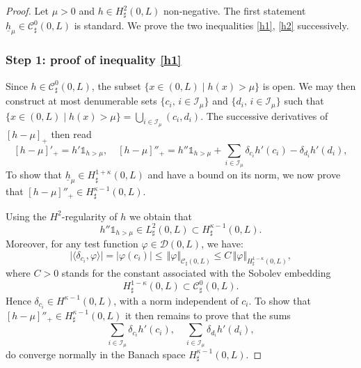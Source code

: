 \documentclass[10pt]{amsart}
\let\mathcal\mathscr
\theoremstyle{remark}
\theoremstyle{definition}
\newcommand{\norme}[1]{\,\Vert #1\Vert}
\newcommand{\hb}{{\underline{h}}}
\begin{document}
\begin{proof}Let $\mu>0$ and $h \in H^{2}_{\sharp}(0,L)$ non-negative. The first statement $\hb_{\mu}\in \mathcal{C}_\sharp^{0}(0,L)$ is standard. We prove the two inequalities \eqref{h1}, \eqref{h2} successively.

\subsubsection*{Step 1: proof of inequality \eqref{h1}}
Since $h \!\in\!{\mathcal C}^0_{\sharp}(0,L)$, the subset \hbox{$\{x\!\in\!(0, L)\mid h(x)\!>\!\mu\}$} is open.
We may then construct at most denumerable sets $\{c_i, \, i\!\in\!\mathcal I_{\mu}\}$ and \hbox{$\{ d_i, \, i\!\in\!\mathcal I_{\mu}\}$} such that $\{x\!\in\!(0, L)\mid h(x)\!>\!\mu\}\!=\! \bigcup_{i\in\mathcal I_{\mu}}(c_{i},d_{i})$. The successive derivatives of $[h-\mu]_{+}$ then read
\[
[h-\mu]'_{+}= h'\mathds{1}_{h>\mu}, \quad [h-\mu]{''}_{+}= h{''}\mathds{1}_{h>\mu}+\sum_{i\in \mathcal I_{\mu}}\delta_{c_{i} }h{'}(c_{i})- \delta_{d_{i}}h'(d_{i}),
\]
To show that $\hb_{\mu} \in H^{1+\kappa}_{\sharp}(0,L)$ and have a bound on its norm, we now prove that
$[h- {\mu}]{''}_{+} \in H^{\kappa-1}_{\sharp}(0,L)$.

Using the $H^{2}$-regularity of $h$ we obtain that
\[
h{''}\mathds{1}_{h>\mu} \in L_\sharp^{2}(0,L) \subset H^{\kappa-1}_{\sharp}(0,L).
\]
Moreover, for any test function $\varphi \in \mathcal{D}(0, L)$, we have:
\[
\vert\langle \delta_{c_{i}},\varphi\rangle\vert = \vert \varphi(c_{i})\vert\leq \norme{\varphi}_{\mathcal{C}_\sharp(0,L)}\leq C\norme{\varphi}_{H_\sharp^{1-\kappa}(0,L)},
\]
where $C>0$ stands for the constant associated with the Sobolev embedding
\[
H_\sharp^{1-\kappa}(0,L) \subset \mathcal{C}^0_\sharp(0,L).
\]
Hence $\delta_{c_{i}} \in H^{\kappa-1}(0,L)$, with a norm independent of $c_{i}$. To show that $[h- {\mu}]{''}_{+} \in H^{\kappa-1}_{\sharp}(0,L)$ it then remains to prove that the sums
\[
\sum_{i\in \mathcal I_{\mu}}\delta_{c_{i} }h{'}(c_{i}), \quad \sum_{i\in \mathcal I_{\mu}}\delta_{d_{i} }h{'}(d_{i}),
\]
do converge normally in the Banach space $H_\sharp^{\kappa-1}(0,L)$.


\end{proof}
\end{document}
